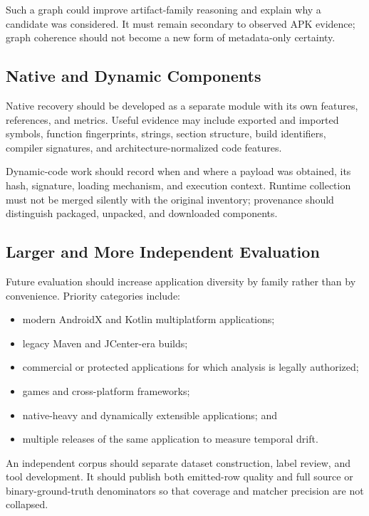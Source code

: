 Such a graph could improve artifact-family reasoning and explain why a
candidate was considered. It must remain secondary to observed APK evidence;
graph coherence should not become a new form of metadata-only certainty.

\subsection{Native and Dynamic Components}

Native recovery should be developed as a separate module with its own
features, references, and metrics. Useful evidence may include exported and
imported symbols, function fingerprints, strings, section structure, build
identifiers, compiler signatures, and architecture-normalized code features.

Dynamic-code work should record when and where a payload was obtained, its
hash, signature, loading mechanism, and execution context. Runtime collection
must not be merged silently with the original \APK inventory; provenance
should distinguish packaged, unpacked, and downloaded components.

\subsection{Larger and More Independent Evaluation}

Future evaluation should increase application diversity by family rather than
by convenience. Priority categories include:

\begin{itemize}
  \item modern AndroidX and Kotlin multiplatform applications;
  \item legacy Maven and JCenter-era builds;
  \item commercial or protected applications for which analysis is legally
  authorized;
  \item games and cross-platform frameworks;
  \item native-heavy and dynamically extensible applications; and
  \item multiple releases of the same application to measure temporal drift.
\end{itemize}

An independent corpus should separate dataset construction, label review, and
tool development. It should publish both emitted-row quality and full source
or binary-ground-truth denominators so that coverage and matcher precision are
not collapsed.

